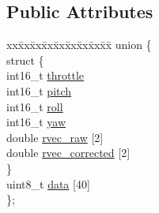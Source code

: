 \subsection*{Public Attributes}
\begin{DoxyCompactItemize}
\item 
\begin{tabbing}
xx\=xx\=xx\=xx\=xx\=xx\=xx\=xx\=xx\=\kill
union \{\\
\>struct \{\\
\>\>int16\_t \hyperlink{structnav__message_a32fbab7c09ee796640dd6e6748702576}{throttle}\\
\>\>int16\_t \hyperlink{structnav__message_af6064924eb9301edcf3d8bfbe6443bb3}{pitch}\\
\>\>int16\_t \hyperlink{structnav__message_a5a9f998f05f761c0ef2ecc4f421e56fa}{roll}\\
\>\>int16\_t \hyperlink{structnav__message_acb15f6079e91e8d5bf14be16293da809}{yaw}\\
\>\>double \hyperlink{structnav__message_a8825929bbd4efd96ec1498bf89194e66}{rvec\_raw} \mbox{[}2\mbox{]}\\
\>\>double \hyperlink{structnav__message_ae77c9ce12a1b1d950b9c4e7a8eb95ffb}{rvec\_corrected} \mbox{[}2\mbox{]}\\
\>\} \\
\>uint8\_t \hyperlink{structnav__message_aefc019e701a7c34f352fca4f15f54e6f}{data} \mbox{[}40\mbox{]}\\
\}; \\

\end{tabbing}\end{DoxyCompactItemize}


